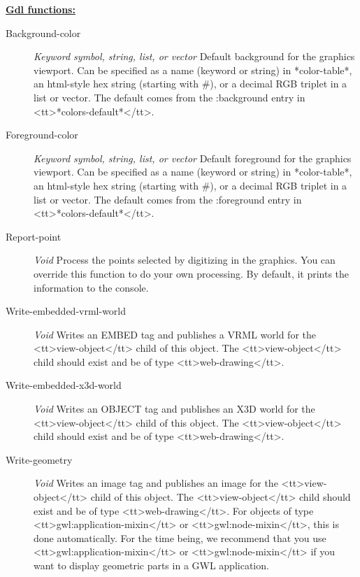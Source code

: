 \documentclass [11pt]{book}
\begin{document}
\begin{itemize}
\begin{description}
\end{description}






\textbf{
\underline{Gdl functions:}}

\begin{description}

\item [Background-color]
\emph{Keyword symbol, string, list, or vector} Default background for the graphics viewport. Can be specified
as a name (keyword or string) in *color-table*, an html-style hex string (starting with \#), or a decimal RGB
triplet in a list or vector. The default comes from the :background entry in <tt>*colors-default*</tt>.


\item [Foreground-color]
\emph{Keyword symbol, string, list, or vector} Default foreground for the graphics viewport. Can be specified
as a name (keyword or string) in *color-table*, an html-style hex string (starting with \#), or a decimal RGB
triplet in a list or vector. The default comes from the :foreground entry in <tt>*colors-default*</tt>.


\item [Report-point]
\emph{Void} Process the points selected by digitizing in the graphics. You can override this
function to do your own processing. By default, it prints the information to the console.


\item [Write-embedded-vrml-world]
\emph{Void} Writes an EMBED tag and publishes a VRML world for the <tt>view-object</tt> child of this object.
The <tt>view-object</tt> child should exist and be of type <tt>web-drawing</tt>.


\item [Write-embedded-x3d-world]
\emph{Void} Writes an OBJECT tag and publishes an X3D world for the <tt>view-object</tt> child of this object.
The <tt>view-object</tt> child should exist and be of type <tt>web-drawing</tt>.


\item [Write-geometry]
\emph{Void} Writes an image tag and publishes an image for the <tt>view-object</tt> child of this object.
The <tt>view-object</tt> child should exist and be of type <tt>web-drawing</tt>.
For objects of type <tt>gwl:application-mixin</tt> or <tt>gwl:node-mixin</tt>, this is done automatically.
For the time being, we recommend that you use <tt>gwl:application-mixin</tt> or <tt>gwl:node-mixin</tt> if you want to
display geometric parts in a GWL application.



\end{description}
\end{itemize}
\end{document}
